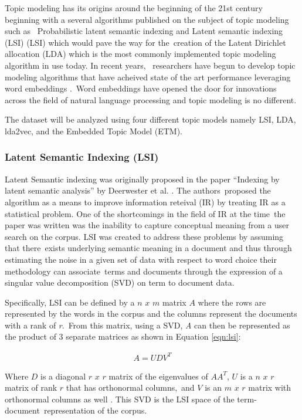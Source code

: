\documentclass[letterpaper,12pt]{article}
\begin{document}
Topic modeling has its origins around the beginning of the 21st century beginning with a several algorithms published on the subject of topic modeling such as \
Probabilistic latent semantic indexing \cite{hofmann1999probabilistic} and Latent semantic indexing (LSI) \cite{papadimitriou2000latent} (LSI) which would pave the way for the\
creation of the Latent Dirichlet allocation (LDA) \cite{blei2003latent} which is the most commonly implemented topic modeling algorithm in use today. In recent years, \
researchers have begun to develop topic modeling algorithms that have acheived state of the art performance leveraging word embeddings \cite{mikolov2013distributed} \cite{dieng2019topic}.\
Word embeddings have opened the door for innovations across the field of natural language processing and topic modeling is no different. 

The dataset will be analyzed using four different topic models namely LSI, LDA, lda2vec, and the Embedded Topic Model (ETM). 
\subsubsection{Latent Semantic Indexing (LSI)}
Latent Semantic indexing was originally proposed in the paper ``Indexing by latent semantic analysis'' by Deerwester et al. \cite{deerwester1990indexing}. The authors\
proposed the algorithm as a means to improve information reteival (IR) by treating IR as a statistical problem. One of the shortcomings in the field of IR at the time\
the paper was written was the inability to capture conceptual meaning from a user search on the corpus. LSI was created to address these problems by assuming that there\
exists underlying semantic meaning in a document and thus through estimating the noise in a given set of data with respect to word choice their methodology can associate\
terms and documents through the expression of a singular value decomposition (SVD) on term to document data.

Specifically, LSI can be defined by a $n$ $x$ $m$ matrix $A$ where the rows are represented by the words in the corpus and the columns represent the documents with a rank of \emph{r}.\
From this matrix, using a SVD, \emph{A} can then be represented as the product of 3 separate matrices as shown in Equation \ref{eqn:lsi}:

\begin{eqnarray}
		A = UDV^T
	\label{eqn:lsi}
\end{eqnarray}

Where $D$ is a diagonal $r$ $x$ $r$ matrix of the eigenvalues of $AA^T$, $U$ is a $n$ $x$ $r$ matrix of rank $r$ that has orthonormal columns,\
and $V$ is an $m$ $x$ $r$ matrix with orthonormal columns as well \cite{papadimitriou2000latent}. This SVD is the LSI space of the term-document\
representation of the corpus. 
\end{document}
